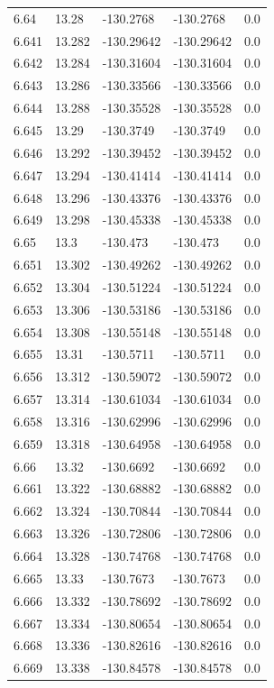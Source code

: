 \begin{tabular}{lllll}
6.64 & 13.28 & -130.2768 & -130.2768 & 0.0 \\
6.641 & 13.282 & -130.29642 & -130.29642 & 0.0 \\
6.642 & 13.284 & -130.31604 & -130.31604 & 0.0 \\
6.643 & 13.286 & -130.33566 & -130.33566 & 0.0 \\
6.644 & 13.288 & -130.35528 & -130.35528 & 0.0 \\
6.645 & 13.29 & -130.3749 & -130.3749 & 0.0 \\
6.646 & 13.292 & -130.39452 & -130.39452 & 0.0 \\
6.647 & 13.294 & -130.41414 & -130.41414 & 0.0 \\
6.648 & 13.296 & -130.43376 & -130.43376 & 0.0 \\
6.649 & 13.298 & -130.45338 & -130.45338 & 0.0 \\
6.65 & 13.3 & -130.473 & -130.473 & 0.0 \\
6.651 & 13.302 & -130.49262 & -130.49262 & 0.0 \\
6.652 & 13.304 & -130.51224 & -130.51224 & 0.0 \\
6.653 & 13.306 & -130.53186 & -130.53186 & 0.0 \\
6.654 & 13.308 & -130.55148 & -130.55148 & 0.0 \\
6.655 & 13.31 & -130.5711 & -130.5711 & 0.0 \\
6.656 & 13.312 & -130.59072 & -130.59072 & 0.0 \\
6.657 & 13.314 & -130.61034 & -130.61034 & 0.0 \\
6.658 & 13.316 & -130.62996 & -130.62996 & 0.0 \\
6.659 & 13.318 & -130.64958 & -130.64958 & 0.0 \\
6.66 & 13.32 & -130.6692 & -130.6692 & 0.0 \\
6.661 & 13.322 & -130.68882 & -130.68882 & 0.0 \\
6.662 & 13.324 & -130.70844 & -130.70844 & 0.0 \\
6.663 & 13.326 & -130.72806 & -130.72806 & 0.0 \\
6.664 & 13.328 & -130.74768 & -130.74768 & 0.0 \\
6.665 & 13.33 & -130.7673 & -130.7673 & 0.0 \\
6.666 & 13.332 & -130.78692 & -130.78692 & 0.0 \\
6.667 & 13.334 & -130.80654 & -130.80654 & 0.0 \\
6.668 & 13.336 & -130.82616 & -130.82616 & 0.0 \\
6.669 & 13.338 & -130.84578 & -130.84578 & 0.0 \\

\end{tabular}
